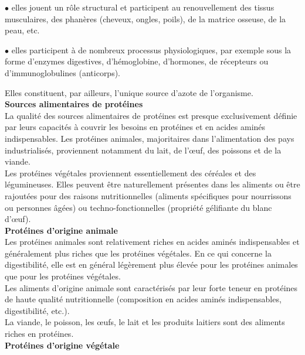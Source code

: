 \documentclass[8pt]{article}
\begin{document}
	$\bullet$ elles jouent un rôle structural et participent au renouvellement des tissus musculaires, des phanères (cheveux, ongles, poils), de la matrice osseuse, de la peau, etc.
	
	$\bullet$ elles participent à de nombreux processus physiologiques, par exemple sous la forme d'enzymes digestives, d'hémoglobine, d'hormones, de récepteurs ou d'immunoglobulines (anticorps).

Elles constituent, par ailleurs, l'unique source d'azote de l'organisme.\\

\textbf{Sources alimentaires de protéines}\\

La qualité des sources alimentaires de protéines est presque exclusivement définie par leurs capacités à couvrir les besoins en protéines et en acides aminés indispensables. Les protéines animales, majoritaires dans l’alimentation des pays industrialisés, proviennent notamment du lait, de l’œuf, des poissons et de la viande.\\

Les protéines végétales proviennent essentiellement des céréales et des légumineuses. Elles peuvent être naturellement présentes dans les aliments ou être rajoutées pour des raisons nutritionnelles (aliments spécifiques pour nourrissons ou personnes âgées) ou techno-fonctionnelles (propriété gélifiante du blanc d’œuf).\\

\textbf{Protéines d'origine animale}\\

Les protéines animales sont relativement riches en acides aminés indispensables et généralement plus riches que les protéines végétales. En ce qui concerne la digestibilité, elle est en général légèrement plus élevée pour les protéines animales que pour les protéines végétales.\\

Les aliments d’origine animale sont caractérisés par leur forte teneur en protéines de haute qualité nutritionnelle (composition en acides aminés indispensables, digestibilité, etc.).  \\

La viande, le poisson, les œufs, le lait et les produits laitiers sont des aliments riches en protéines.\\

\textbf{Protéines d'origine végétale}\\
\end{document}
